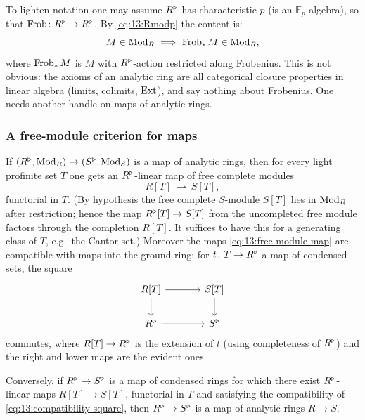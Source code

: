 To lighten notation one may assume $R^{\triangleright}$ has characteristic $p$ (is an
$\mathbb{F}_p$-algebra), so that $\operatorname{Frob}\colon R^{\triangleright}\to R^{\triangleright}$. By
\eqref{eq:13:Rmodp} the content is:
\begin{equation*}
M\in\operatorname{Mod}_R\ \Longrightarrow\ \operatorname{Frob}_* M\in\operatorname{Mod}_R,
\end{equation*}
where $\operatorname{Frob}_*M$ is $M$ with $R^{\triangleright}$-action restricted along Frobenius. This is
not obvious: the axioms of an analytic ring are all categorical closure
properties in linear algebra (limits, colimits, $\operatorname{Ext}$), and say nothing about
Frobenius. One needs another handle on maps of analytic rings.

\subsubsection*{A free-module criterion for maps}

\begin{proposition}
\label{prop:13:free-module-data}
If $(R^{\triangleright},\operatorname{Mod}_R)\to(S^{\triangleright},\operatorname{Mod}_S)$ is a map of analytic rings, then for every
light profinite set $T$ one gets an $R^{\triangleright}$-linear map of free complete modules
\begin{equation}
\label{eq:13:free-module-map}
R[T]\ \longrightarrow\ S[T],
\end{equation}
functorial in $T$. (By hypothesis the free complete $S$-module $S[T]$ lies in
$\operatorname{Mod}_R$ after restriction; hence the map $R^{\triangleright}[T]\to S[T]$ from the uncompleted
free module factors through the completion $R[T]$. It suffices to have this for a
generating class of $T$, e.g.\ the Cantor set.) Moreover the maps
\eqref{eq:13:free-module-map} are compatible with maps into the ground ring: for
$t\colon T\to R^{\triangleright}$ a map of condensed sets, the square
\begin{equation}
\label{eq:13:compatibility-square}
\begin{tikzcd}[column sep=large]
R[T] \arrow[r] \arrow[d] & S[T] \arrow[d] \\
\ur R \arrow[r] & \ur S
\end{tikzcd}
\end{equation}
commutes, where $R[T]\to R^{\triangleright}$ is the extension of $t$ (using completeness of
$R^{\triangleright}$) and the right and lower maps are the evident ones.
\end{proposition}

\begin{lemma}
\label{lem:13:sufficiency}
Conversely, if $R^{\triangleright}\to S^{\triangleright}$ is a map of condensed rings for which there exist
$R^{\triangleright}$-linear maps $R[T]\to S[T]$, functorial in $T$ and satisfying the
compatibility of \eqref{eq:13:compatibility-square}, then $R^{\triangleright}\to S^{\triangleright}$ is a
map of analytic rings $R\to S$.
\end{lemma}

